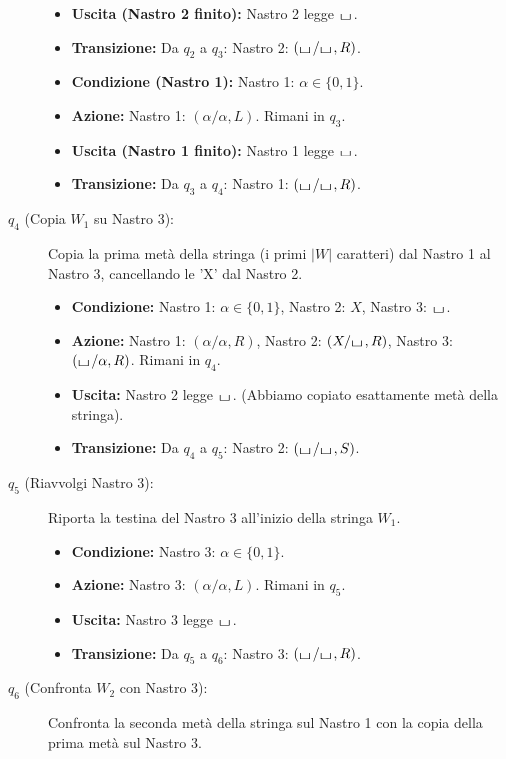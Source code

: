 \documentclass[a4paper]{article}
\theoremstyle{definition} %
\newcommand{\blankS}{\ensuremath{\raisebox{-0.15ex}{\scalebox{1.3}[0.7]{$\sqcup$}}\mkern2mu}}
\begin{document}
\begin{description}
\begin{itemize}
        \item \textbf{Uscita (Nastro 2 finito):} Nastro 2 legge $\blankS$.
        \item \textbf{Transizione:} Da $q_2$ a $q_3$: Nastro 2: $(\blankS/\blankS, R)$.
        \item \textbf{Condizione (Nastro 1):} Nastro 1: $\alpha \in \{0,1\}$.
        \item \textbf{Azione:} Nastro 1: $(\alpha/\alpha, L)$. Rimani in $q_3$.
        \item \textbf{Uscita (Nastro 1 finito):} Nastro 1 legge $\blankS$.
        \item \textbf{Transizione:} Da $q_3$ a $q_4$: Nastro 1: $(\blankS/\blankS, R)$.
    \end{itemize}
    \item[$q_4$ (Copia $W_1$ su Nastro 3):] Copia la prima metà della stringa (i primi $|W|$ caratteri) dal Nastro 1 al Nastro 3, cancellando le 'X' dal Nastro 2.
    \begin{itemize}
        \item \textbf{Condizione:} Nastro 1: $\alpha \in \{0,1\}$, Nastro 2: $X$, Nastro 3: $\blankS$.
        \item \textbf{Azione:} Nastro 1: $(\alpha/\alpha, R)$, Nastro 2: $(X/\blankS, R)$, Nastro 3: $(\blankS/\alpha, R)$. Rimani in $q_4$.
        \item \textbf{Uscita:} Nastro 2 legge $\blankS$. (Abbiamo copiato esattamente metà della stringa).
        \item \textbf{Transizione:} Da $q_4$ a $q_5$: Nastro 2: $(\blankS/\blankS, S)$.
    \end{itemize}
    \item[$q_5$ (Riavvolgi Nastro 3):] Riporta la testina del Nastro 3 all'inizio della stringa $W_1$.
    \begin{itemize}
        \item \textbf{Condizione:} Nastro 3: $\alpha \in \{0,1\}$.
        \item \textbf{Azione:} Nastro 3: $(\alpha/\alpha, L)$. Rimani in $q_5$.
        \item \textbf{Uscita:} Nastro 3 legge $\blankS$.
        \item \textbf{Transizione:} Da $q_5$ a $q_6$: Nastro 3: $(\blankS/\blankS, R)$.
    \end{itemize}
    \item[$q_6$ (Confronta $W_2$ con Nastro 3):] Confronta la seconda metà della stringa sul Nastro 1 con la copia della prima metà sul Nastro 3.

\end{description}
\end{document}
